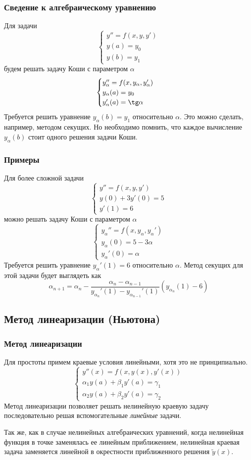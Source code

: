 \documentclass[professionalfonts,compress,unicode,aspectratio=169]{beamer}
\begin{document}
\begin{frame}\frametitle{Сведение к алгебраическому уравнению}
	Для задачи
	\[\begin{cases}
		y'' = f(x, y, y')\\
		y(a) = y_0\\
		y(b) = y_1
	\end{cases}\]
	будем решать задачу Коши с параметром $\alpha$
	\[\begin{cases}
		y_{\alpha}'' = f(x, y_{\alpha}, y_{\alpha}')\\
		y_{\alpha}(a) = y_0\\
		y_{\alpha}'(a) = \tg \alpha
	\end{cases}\]
	Требуется решить уравнение $y_{\alpha}(b) = y_1$ относительно $\alpha$. 
	Это можно сделать, например, методом секущих. Но необходимо помнить, что
	каждое вычисление $y_{\alpha}(b)$ 
	стоит одного решения задачи Коши.
\end{frame}

\begin{frame}\frametitle{Примеры}
	Для более сложной задачи
	\[\begin{cases}
		y'' = f(x, y, y')\\
		y(0) + 3y'(0)= 5\\
		y'(1) = 6
	\end{cases}\]
	можно решать задачу Коши с параметром $\alpha$
	\[\begin{cases}
		y_{\alpha}'' = f(x, y_{\alpha}, y_{\alpha}')\\
		y_{\alpha}(0) = 5 - 3 \alpha\\
		y_{\alpha}'(0) = \alpha
	\end{cases}\]
	Требуется решить уравнение $y_{\alpha}'(1) = 6$ относительно $\alpha$. 
	Метод секущих для этой задачи будет выглядеть как
	\[
	\alpha_{n+1} = \alpha_n - \frac{\alpha_{n} - \alpha_{n-1}}{y_{\alpha_n}'(1)
	- y_{\alpha_{n-1}}'(1)} \left(y_{\alpha_n}(1) - 6\right)
	\]
\end{frame}

\subsection{Метод линеаризации (Ньютона)}
\begin{frame}\frametitle{Метод линеаризации}
	Для простоты примем краевые условия линейными, хотя это не принципиально.
	\[\begin{cases}
	y''(x) = f(x, y(x), y'(x))\\
	\alpha_1 y(a) + \beta_1 y'(a) = \gamma_1\\
	\alpha_2 y(a) + \beta_2 y'(a) = \gamma_2
	\end{cases}\]
	Метод линеаризации позволяет решать нелинейную краевую задачу последовательно решая
	вспомогательные \emph{линейные} задачи.

	Так же, как в случае нелинейных алгебраических уравнений, когда нелинейная функция
	в точке заменялась ее линейным приближением, нелинейная краевая задача заменяется 
	линейной в окрестности приближенного решения $\tilde{y}(x)$.
\end{frame}
\end{document}
